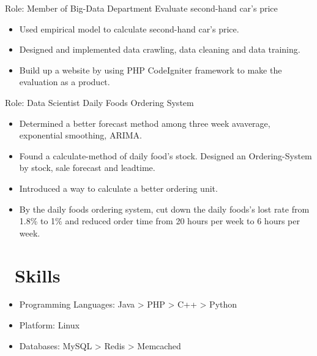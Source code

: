 \documentclass{resume}
\begin{document}
Role: Member of Big-Data Department
\newline Evaluate second-hand car's price
\begin{itemize}
  \item Used empirical model to calculate second-hand car's price.
  \item Designed and implemented data crawling, data cleaning and data training. 
  \item Build up a website by using PHP CodeIgniter framework to make the evaluation as a product.
\end{itemize}

Role: Data Scientist
\newline Daily Foods Ordering System
\begin{itemize}
  \item Determined a better forecast method among three week avaverage, exponential smoothing, ARIMA.
  \item Found a calculate-method of daily food’s stock. Designed an Ordering-System by stock, sale forecast and leadtime.
  \item Introduced a way to calculate a better ordering unit.
  \item By the daily foods ordering system, cut down the daily foods's lost rate from 1.8\% to 1\% and reduced order time from 20 hours per week to 6 hours per week.
\end{itemize}

\section{\faCogs\ Skills}
\begin{itemize}[parsep=0.5ex]
  \item Programming Languages: Java > PHP > C++ > Python
  \item Platform: Linux
  \item Databases: MySQL > Redis > Memcached
\end{itemize}
\end{document}
